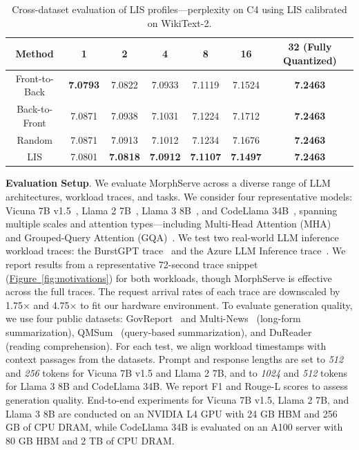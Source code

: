 \documentclass{article}
\newcommand{\system}{{MorphServe}\xspace}
\begin{document}
{\begin{table}[h]
\caption{Cross-dataset evaluation of LIS profiles---perplexity on C4 using LIS calibrated on WikiText-2.}\label{tab:cross_dataset}
\centering
\begin{tabular}{|c|c|c|c|c|c|c|}
\hline
\textbf{Method} & \textbf{1} & \textbf{2} & \textbf{4} & \textbf{8} & \textbf{16} & \textbf{32 (Fully Quantized)} \\ \hline
Front-to-Back & \textbf{7.0793} & 7.0822 & 7.0933 & 7.1119 & 7.1524 & \textbf{7.2463} \\ \hline
Back-to-Front & 7.0871 & 7.0938 & 7.1031 & 7.1224 & 7.1712 & \textbf{7.2463} \\ \hline
Random & 7.0871 & 7.0913 & 7.1012 & 7.1234 & 7.1676 & \textbf{7.2463} \\ \hline
LIS & 7.0801 & \textbf{7.0818} & \textbf{7.0912} & \textbf{7.1107} & \textbf{7.1497} & \textbf{7.2463} \\ \hline
\end{tabular}
\end{table}

\textbf{Evaluation Setup}.
We evaluate {\system} across a diverse range of LLM architectures, workload traces, and tasks. 
We consider four representative models: Vicuna 7B v1.5~\cite{vicuna_7b_v1.5}, Llama 2 7B~\cite{touvron2023llama2}, Llama 3 8B~\cite{grattafiori2024llama3}, and CodeLlama 34B~\cite{roziere2023codellama}, spanning multiple scales and attention types---including Multi-Head Attention (MHA)~\cite{vaswani2017attention} and Grouped-Query Attention (GQA)~\cite{ainslie2023gqa}.
We test two real-world LLM inference workload traces: the BurstGPT trace~\cite{wang2024burstgpt} and the Azure LLM Inference trace~\cite{stojkovic2025dynamollm, azure_LLM_inference_trace}. 
We report results from a representative 72-second trace snippet (\hyperref[fig:motivations]{Figure~\ref{fig:motivations}}) for both workloads, though {\system} is effective across the full traces.
The request arrival rates
of each trace are downscaled by 1.75$\times$ and 4.75$\times$ to fit our hardware environment. 
To evaluate generation quality, 
we use four public datasets: GovReport~\cite{gov_report} and Multi-News~\cite{fabbri2019multi} (long-form summarization), QMSum~\cite{zhong2021qmsum} (query-based summarization), and DuReader~\cite{he2017dureader} (reading comprehension). 
For each test, we align workload timestamps with context passages from the datasets. Prompt and response lengths are set to \emph{512} and \emph{256} tokens for Vicuna 7B v1.5 and Llama 2 7B, and to \emph{1024} and \emph{512} tokens for Llama 3 8B and CodeLlama 34B. We report F1 and Rouge-L scores to assess generation quality. End-to-end experiments for Vicuna 7B v1.5, Llama 2 7B, and Llama 3 8B are conducted on an NVIDIA L4 GPU with 24 GB HBM and 256 GB of CPU DRAM, while CodeLlama 34B is evaluated on an A100 server with 80 GB HBM and 2 TB of CPU DRAM.

}
\end{document}

